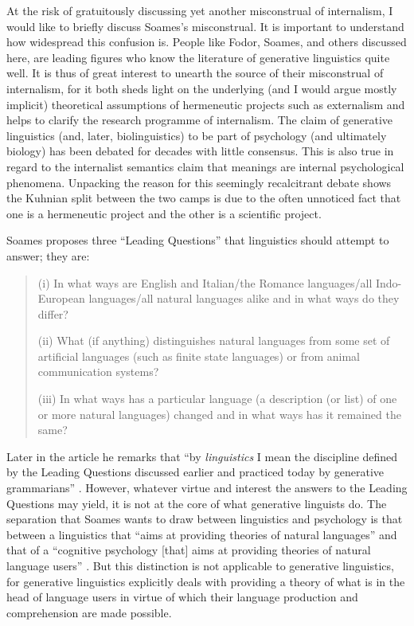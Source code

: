 At the risk of gratuitously discussing yet another misconstrual of internalism, I would like to briefly discuss Soames’s misconstrual. It is important to understand how widespread this confusion is. People like Fodor, Soames, and others discussed here, are leading figures who know the literature of generative linguistics quite well. It is thus of great interest to unearth the source of their misconstrual of internalism, for it both sheds light on the underlying (and I would argue mostly implicit) theoretical assumptions of hermeneutic projects such as externalism and helps to clarify the research programme of internalism. The claim of generative linguistics (and, later, biolinguistics) to be part of psychology (and ultimately biology) has been debated for decades with little consensus. This is also true in regard to the internalist semantics claim that meanings are internal psychological phenomena. Unpacking the reason for this seemingly recalcitrant debate shows the Kuhnian split between the two camps is due to the often unnoticed fact that one is a hermeneutic project and the other is a scientific project.
	
Soames proposes three “Leading Questions” that linguistics should attempt to answer; they are: 
\begin{quote}
(i) In what ways are English and Italian/the Romance languages/all Indo-European languages/all natural languages alike and in what ways do they differ?

(ii) What (if anything) distinguishes natural languages from some set of artificial languages (such as finite state languages) or from animal communication systems?

(iii) In what ways has a particular language (a description (or list) of one or more natural languages) changed and in what ways has it remained the same? \citep[158]{Soames1984}
\end{quote}
Later in the article he remarks that “by \textit{linguistics} I mean the discipline defined by the Leading Questions discussed earlier and practiced today by generative grammarians” \citep[178, fn. 24, emphasis in original]{Soames1984}. However, whatever virtue and interest the answers to the Leading Questions may yield, it is not at the core of what generative linguists do. The separation that Soames wants to draw between linguistics and psychology  is that between a linguistics that “aims at providing theories of natural languages” and  that of a “cognitive psychology [that] aims at providing theories of natural language users” \citep[157]{Soames1984}. But this distinction is not applicable to generative linguistics, for generative linguistics explicitly deals with providing a theory of what is in the head of language users in virtue of which their language production and comprehension are made possible.

